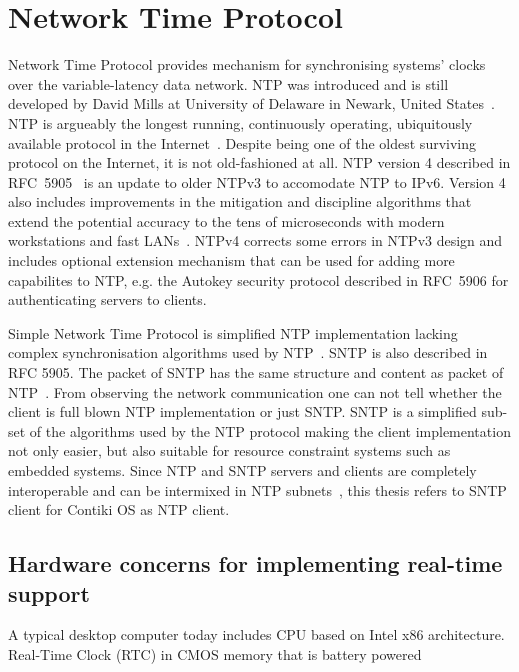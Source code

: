 
\chapter{Network Time Protocol}
Network Time Protocol provides mechanism for synchronising systems' clocks over the variable-latency data network.
NTP was introduced and is still developed by David Mills at University of Delaware in Newark, United States~\cite{ntp-history}.
NTP is argueably the longest running, continuously operating,
ubiquitously available protocol in the Internet~\cite{ntp-overview}.
Despite being one of the oldest surviving protocol on the Internet, it is not old-fashioned at all.
NTP version 4 described in RFC~5905~\cite{rfc5905} is an update to older NTPv3 to accomodate NTP to IPv6.
Version 4 also includes improvements in
the mitigation and discipline algorithms that extend
the potential accuracy to the tens of microseconds with modern
workstations and fast LANs~\cite{rfc5905}.
NTPv4 corrects some
errors in NTPv3 design and includes optional extension mechanism
that can be used for adding more capabilites to NTP, e.g. the
Autokey security protocol described in RFC~5906
for authenticating servers to clients.

Simple Network Time Protocol is simplified NTP implementation lacking complex
synchronisation algorithms used by NTP~\cite{rfc5905}.
SNTP is also described in RFC 5905.
The packet of SNTP has the same structure and content as packet of NTP~\cite{rfc5905}.
From observing the network communication one can not tell whether the client
is full blown NTP implementation or just SNTP.
SNTP is a simplified sub-set of the algorithms used by the NTP protocol
making the client implementation not only easier, but also suitable for
resource constraint systems such as embedded systems.
Since NTP and SNTP servers and clients are
completely interoperable and can be intermixed in NTP subnets~\cite{rfc5905},
this thesis refers to SNTP client for Contiki OS as NTP client.











\section{Hardware concerns for implementing real-time support}
A typical desktop computer today includes CPU based on Intel x86 architecture.
Real-Time Clock (RTC) in CMOS memory that is battery powered

